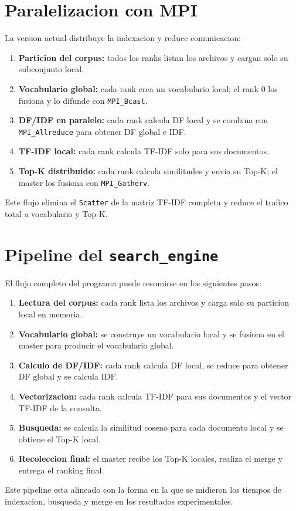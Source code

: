\documentclass[11pt]{article}
\begin{document}
\section{Paralelizacion con MPI}
La version actual distribuye la indexacion y reduce comunicacion:
\begin{enumerate}
  \item \textbf{Particion del corpus:} todos los ranks listan los archivos y
  cargan solo su subconjunto local.
  \item \textbf{Vocabulario global:} cada rank crea un vocabulario local;
  el rank 0 los fusiona y lo difunde con \texttt{MPI\_Bcast}.
  \item \textbf{DF/IDF en paralelo:} cada rank calcula DF local y se combina
  con \texttt{MPI\_Allreduce} para obtener DF global e IDF.
  \item \textbf{TF-IDF local:} cada rank calcula TF-IDF solo para sus documentos.
  \item \textbf{Top-K distribuido:} cada rank calcula similitudes y envia su
  Top-K; el master los fusiona con \texttt{MPI\_Gatherv}.
\end{enumerate}
Este flujo elimina el \texttt{Scatter} de la matriz TF-IDF completa y reduce
el trafico total a vocabulario y Top-K.

\section{Pipeline del \texttt{search\_engine}}
El flujo completo del programa puede resumirse en los siguientes pasos:
\begin{enumerate}
  \item \textbf{Lectura del corpus:} cada rank lista los archivos y carga solo
  su particion local en memoria.
  \item \textbf{Vocabulario global:} se construye un vocabulario local y se
  fusiona en el master para producir el vocabulario global.
  \item \textbf{Calculo de DF/IDF:} cada rank calcula DF local, se reduce para
  obtener DF global y se calcula IDF.
  \item \textbf{Vectorizacion:} cada rank calcula TF-IDF para sus documentos
  y el vector TF-IDF de la consulta.
  \item \textbf{Busqueda:} se calcula la similitud coseno para cada documento
  local y se obtiene el Top-K local.
  \item \textbf{Recoleccion final:} el master recibe los Top-K locales,
  realiza el merge y entrega el ranking final.
\end{enumerate}
Este pipeline esta alineado con la forma en la que se midieron los tiempos
de indexacion, busqueda y merge en los resultados experimentales.
\end{document}
